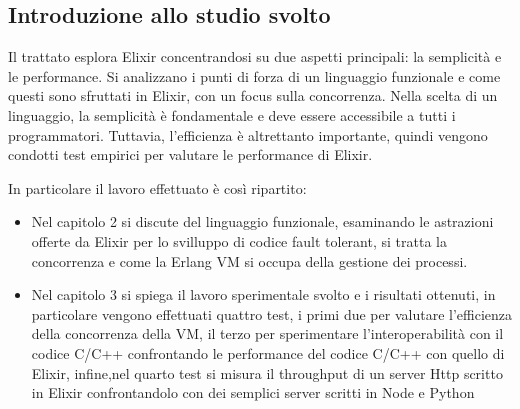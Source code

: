 \subsection{Introduzione allo studio svolto}

Il trattato esplora Elixir concentrandosi su due aspetti principali:
la semplicità e le performance. Si analizzano i punti di forza di 
un linguaggio funzionale e come questi sono sfruttati in Elixir, con 
un focus sulla concorrenza. Nella scelta di un linguaggio, la semplicità
è fondamentale e deve essere accessibile a tutti i programmatori.
Tuttavia, l'efficienza è altrettanto importante, quindi vengono condotti
test empirici per valutare le performance di Elixir.

In particolare il lavoro effettuato è così ripartito: 


\begin{itemize}
	\item Nel capitolo 2 si discute del linguaggio funzionale,
	esaminando le astrazioni offerte da Elixir per lo svilluppo
	di codice fault tolerant, si tratta la concorrenza e come la Erlang VM
	si occupa della gestione dei processi.
	\item Nel capitolo 3 si spiega il lavoro sperimentale svolto e i risultati
	ottenuti, in particolare vengono effettuati quattro test, i primi due
	per valutare l'efficienza della concorrenza della VM, il terzo per
	sperimentare l'interoperabilità con il codice C/C++ confrontando le
	performance del codice C/C++ con quello di Elixir, infine,nel quarto test
	si misura il throughput di un server Http scritto in
	Elixir confrontandolo con dei semplici server scritti in Node e Python

\end{itemize}



